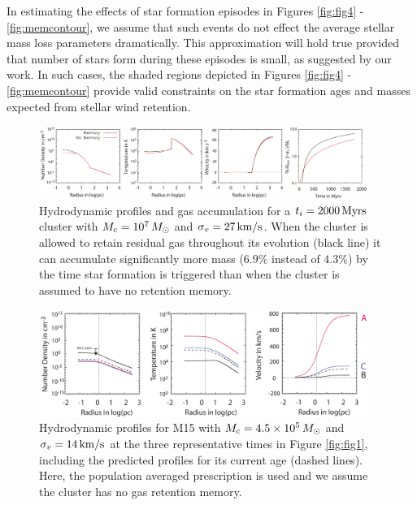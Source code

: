 \documentclass[fleqn,usenatbib]{mnras}
\begin{document}
In estimating the effects of star formation episodes in Figures \ref{fig:fig4} - \ref{fig:memcontour}, we assume that such events do not effect the average stellar mass loss parameters dramatically.  This approximation will hold true provided that  number  of stars  form during these episodes is small, as suggested by our work. In such cases, the shaded regions depicted in Figures \ref{fig:fig4} - \ref{fig:memcontour} provide valid  constraints on  the star formation ages and masses expected from stellar wind  retention.




\begin{figure}
\centering\includegraphics[width=0.95\textwidth]{memory.pdf}
\caption{Hydrodynamic profiles and gas accumulation for a $t_i = 2000 \, {\rm Myrs}$ cluster with  $M_{\rm c} = 10^7 \, M_\odot$
and $\sigma_v = 27 \, {\rm km/ s}$.  
When the cluster is allowed to retain residual gas throughout its evolution (black line) it can accumulate 
significantly more mass ($6.9\%$ instead of $4.3\%$) by the time star formation is triggered than when the cluster is assumed to have no retention memory.}
\label{fig:memhydroprofiles}
\end{figure} 


\begin{figure}
\centering\includegraphics[width=0.95\textwidth]{fig3.pdf}
\caption{Hydrodynamic profiles for M15 with $M_{\rm c} = 4.5 \times 10^5 \, M_\odot$
and $\sigma_v = 14 \, {\rm km/s}$  \citep{mcnamara,gerssen} at the three representative times in Figure \ref{fig:fig1}, including the predicted profiles for 
its current age (dashed lines).   Here, the population averaged prescription is used and  we assume  the cluster has no gas retention memory.}
\label{fig:fig3}
\end{figure} 
\end{document}
